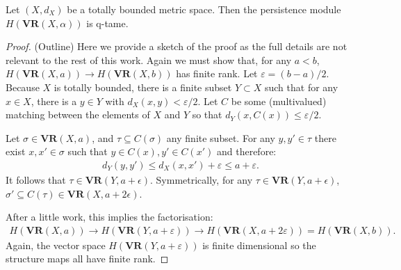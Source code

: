 \begin{theorem}
\label{thm-tb-qtame}
Let $(X, d_X)$ be a totally bounded metric space. Then the persistence module $H(\mathbf{VR}(X, \alpha))$ is q-tame.
\end{theorem}
\begin{proof}(Outline)
Here we provide a sketch of the proof as the full details are not relevant to the rest of this work. Again we must show that, for any $a < b$, $H(\mathbf{VR}(X, a)) \to H(\mathbf{VR}(X, b))$ has finite rank. Let $\varepsilon = (b-a)/2$. Because $X$ is totally bounded, there is a finite subset $Y \subset X$ such that for any $x \in X$, there is a $y \in Y$ with $d_X(x, y) < \varepsilon / 2$. Let $C$ be some (multivalued) matching between the elements of $X$ and $Y$ so that $d_Y(x, C(x)) \leq \varepsilon / 2$.

Let $\sigma \in \mathbf{VR}(X, a)$, and $\tau \subseteq C(\sigma)$ any finite subset. For any $y, y' \in \tau$ there exist $x, x' \in \sigma$ such that $y \in C(x), y' \in C(x')$ and therefore:
\begin{align*}
d_Y(y, y') \leq d_X(x, x') + \varepsilon \leq a + \varepsilon.
\end{align*}
It follows that $\tau \in \mathbf{VR}(Y, a + \epsilon)$. Symmetrically, for any $\tau \in \mathbf{VR}(Y, a + \epsilon)$, $\sigma' \subseteq C(\tau) \in \mathbf{VR}(X, a + 2 \epsilon)$.

After a little work, this implies the factorisation:
\begin{align*}
H(\mathbf{VR}(X, a)) \to H(\mathbf{VR}(Y, a+\varepsilon)) \to H(\mathbf{VR}(X, a+ 2 \varepsilon)) = H(\mathbf{VR}(X, b)).
\end{align*}
Again, the vector space $H(\mathbf{VR}(Y, a+\varepsilon))$ is finite dimensional so the structure maps all have finite rank.
\end{proof}